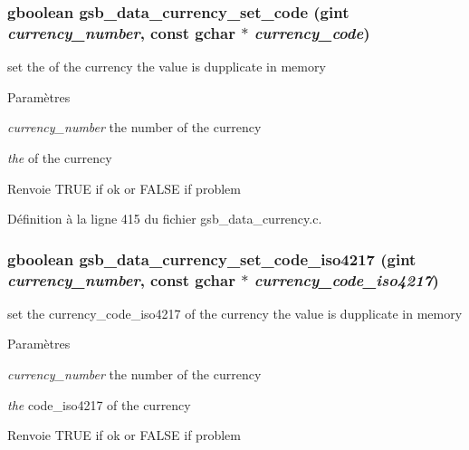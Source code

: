 \subsubsection[{gsb\_\-data\_\-currency\_\-set\_\-code}]{\setlength{\rightskip}{0pt plus 5cm}gboolean gsb\_\-data\_\-currency\_\-set\_\-code (gint {\em currency\_\-number}, \/  const gchar $\ast$ {\em currency\_\-code})}\label{gsb__data__currency_8h_a94d85b5a948e43a4df652c4c8c60dd8b}
set the of the currency the value is dupplicate in memory


\begin{DoxyParams}{Paramètres}
\item[{\em currency\_\-number}]the number of the currency \item[{\em the}]of the currency\end{DoxyParams}
\begin{DoxyReturn}{Renvoie}
TRUE if ok or FALSE if problem 
\end{DoxyReturn}


Définition à la ligne 415 du fichier gsb\_\-data\_\-currency.c.

\subsubsection[{gsb\_\-data\_\-currency\_\-set\_\-code\_\-iso4217}]{\setlength{\rightskip}{0pt plus 5cm}gboolean gsb\_\-data\_\-currency\_\-set\_\-code\_\-iso4217 (gint {\em currency\_\-number}, \/  const gchar $\ast$ {\em currency\_\-code\_\-iso4217})}\label{gsb__data__currency_8h_a79611173faac5c36794d84e8bbd039e5}
set the currency\_\-code\_\-iso4217 of the currency the value is dupplicate in memory


\begin{DoxyParams}{Paramètres}
\item[{\em currency\_\-number}]the number of the currency \item[{\em the}]code\_\-iso4217 of the currency\end{DoxyParams}
\begin{DoxyReturn}{Renvoie}
TRUE if ok or FALSE if problem 
\end{DoxyReturn}


